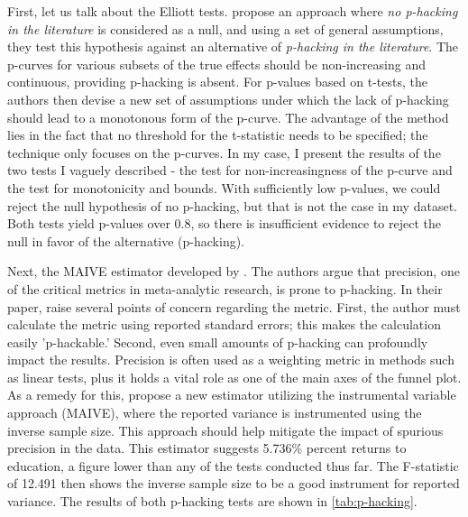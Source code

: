 First, let us talk about the Elliott tests. \cite{elliott2022hacking} propose an approach where \textit{no p-hacking in the literature} is considered as a null, and using a set of general assumptions, they test this hypothesis against an alternative of \textit{p-hacking in the literature}. The p-curves for various subsets of the true effects should be non-increasing and continuous, providing p-hacking is absent. For p-values based on t-tests, the authors then devise a new set of assumptions under which the lack of p-hacking should lead to a monotonous form of the p-curve. The advantage of the method lies in the fact that no threshold for the t-statistic needs to be specified; the technique only focuses on the p-curves. In my case, I present the results of the two tests I vaguely described - the test for non-increasingness of the p-curve and the test for monotonicity and bounds. With sufficiently low p-values, we could reject the null hypothesis of no p-hacking, but that is not the case in my dataset. Both tests yield p-values over 0.8, so there is insufficient evidence to reject the null in favor of the alternative (p-hacking).

Next, the \ac{MAIVE} estimator developed by \cite{irsova2023maive}. The authors argue that precision, one of the critical metrics in meta-analytic research, is prone to p-hacking. In their paper, \cite{irsova2023maive} raise several points of concern regarding the metric. First, the author must calculate the metric using reported standard errors; this makes the calculation easily 'p-hackable.' Second, even small amounts of p-hacking can profoundly impact the results. Precision is often used as a weighting metric in methods such as linear tests, plus it holds a vital role as one of the main axes of the funnel plot. As a remedy for this, \cite{irsova2023maive} propose a new estimator utilizing the instrumental variable approach (\ac{MAIVE}), where the reported variance is instrumented using the inverse sample size. This approach should help mitigate the impact of spurious precision in the data. This estimator suggests 5.736\% percent returns to education, a figure lower than any of the tests conducted thus far. The F-statistic of 12.491 then shows the inverse sample size to be a good instrument for reported variance. The results of both p-hacking tests are shown in \autoref{tab:p-hacking}.


